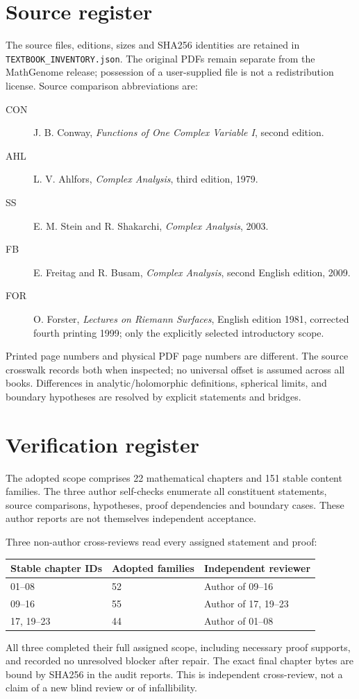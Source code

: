 \documentclass[11pt,a4paper,openany]{book}
\theoremstyle{definition}
\theoremstyle{remark}\newtheorem{remark}[theorem]{Remark}
\begin{document}
\chapter*{Source register}
The source files, editions, sizes and SHA256 identities are retained in
\texttt{TEXTBOOK\_INVENTORY.json}. The original PDFs remain separate from the
MathGenome release; possession of a user-supplied file is not a redistribution
license. Source comparison abbreviations are:
\begin{description}
\item[CON] J. B. Conway, \emph{Functions of One Complex Variable I}, second edition.
\item[AHL] L. V. Ahlfors, \emph{Complex Analysis}, third edition, 1979.
\item[SS] E. M. Stein and R. Shakarchi, \emph{Complex Analysis}, 2003.
\item[FB] E. Freitag and R. Busam, \emph{Complex Analysis}, second English edition, 2009.
\item[FOR] O. Forster, \emph{Lectures on Riemann Surfaces}, English edition 1981,
corrected fourth printing 1999; only the explicitly selected introductory scope.
\end{description}
Printed page numbers and physical PDF page numbers are different. The source
crosswalk records both when inspected; no universal offset is assumed across
all books. Differences in analytic/holomorphic definitions, spherical limits,
and boundary hypotheses are resolved by explicit statements and bridges.


\chapter*{Verification register}
The adopted scope comprises 22 mathematical chapters and 151 stable content
families. The three author self-checks enumerate all constituent statements,
source comparisons, hypotheses, proof dependencies and boundary cases.
These author reports are not themselves independent acceptance.

Three non-author cross-reviews read every assigned statement and proof:
\begin{center}
\begin{tabular}{lll}\toprule
Stable chapter IDs & Adopted families & Independent reviewer\\\midrule
01--08 & 52 & Author of 09--16\\
09--16 & 55 & Author of 17, 19--23\\
17, 19--23 & 44 & Author of 01--08\\\bottomrule
\end{tabular}
\end{center}
All three completed their full assigned scope, including necessary proof
supports, and recorded no unresolved blocker after repair. The exact final
chapter bytes are bound by SHA256 in the audit reports. This is independent
cross-review, not a claim of a new blind review or of infallibility.
\end{document}
